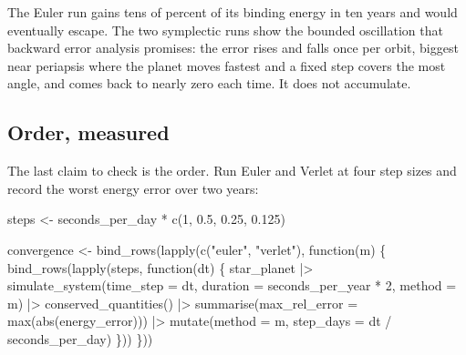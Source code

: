 \documentclass[
  10.5pt,
  letterpaper,
]{scrbook}
\newenvironment{Shaded}{\begin{snugshade}}{\end{snugshade}}
\newcommand{\AttributeTok}[1]{\textcolor[rgb]{0.00,0.00,0.00}{#1}}
\newcommand{\ControlFlowTok}[1]{\textcolor[rgb]{0.00,0.00,0.00}{#1}}
\newcommand{\DecValTok}[1]{\textcolor[rgb]{0.00,0.00,0.00}{#1}}
\newcommand{\FloatTok}[1]{\textcolor[rgb]{0.00,0.00,0.00}{#1}}
\newcommand{\FunctionTok}[1]{\textcolor[rgb]{0.00,0.00,0.00}{#1}}
\newcommand{\NormalTok}[1]{\textcolor[rgb]{0.00,0.00,0.00}{#1}}
\newcommand{\OtherTok}[1]{\textcolor[rgb]{0.00,0.00,0.00}{#1}}
\newcommand{\SpecialCharTok}[1]{\textcolor[rgb]{0.00,0.00,0.00}{#1}}
\newcommand{\StringTok}[1]{\textcolor[rgb]{0.00,0.00,0.00}{#1}}
\theoremstyle{definition}
\theoremstyle{plain}
\theoremstyle{remark}
\begin{document}
The Euler run gains tens of percent of its binding energy in ten years
and would eventually escape. The two symplectic runs show the bounded
oscillation that backward error analysis promises: the error rises and
falls once per orbit, biggest near periapsis where the planet moves
fastest and a fixed step covers the most angle, and comes back to nearly
zero each time. It does not accumulate.

\subsection{Order, measured}\label{order-measured}

The last claim to check is the order. Run Euler and Verlet at four step
sizes and record the worst energy error over two years:

\begin{Shaded}
\begin{Highlighting}[]
\NormalTok{steps }\OtherTok{\textless{}{-}}\NormalTok{ seconds\_per\_day }\SpecialCharTok{*} \FunctionTok{c}\NormalTok{(}\DecValTok{1}\NormalTok{, }\FloatTok{0.5}\NormalTok{, }\FloatTok{0.25}\NormalTok{, }\FloatTok{0.125}\NormalTok{)}

\NormalTok{convergence }\OtherTok{\textless{}{-}} \FunctionTok{bind\_rows}\NormalTok{(}\FunctionTok{lapply}\NormalTok{(}\FunctionTok{c}\NormalTok{(}\StringTok{"euler"}\NormalTok{, }\StringTok{"verlet"}\NormalTok{), }\ControlFlowTok{function}\NormalTok{(m) \{}
  \FunctionTok{bind\_rows}\NormalTok{(}\FunctionTok{lapply}\NormalTok{(steps, }\ControlFlowTok{function}\NormalTok{(dt) \{}
\NormalTok{    star\_planet }\SpecialCharTok{|\textgreater{}}
      \FunctionTok{simulate\_system}\NormalTok{(}\AttributeTok{time\_step =}\NormalTok{ dt, }\AttributeTok{duration =}\NormalTok{ seconds\_per\_year }\SpecialCharTok{*} \DecValTok{2}\NormalTok{,}
                      \AttributeTok{method =}\NormalTok{ m) }\SpecialCharTok{|\textgreater{}}
      \FunctionTok{conserved\_quantities}\NormalTok{() }\SpecialCharTok{|\textgreater{}}
      \FunctionTok{summarise}\NormalTok{(}\AttributeTok{max\_rel\_error =} \FunctionTok{max}\NormalTok{(}\FunctionTok{abs}\NormalTok{(energy\_error))) }\SpecialCharTok{|\textgreater{}}
      \FunctionTok{mutate}\NormalTok{(}\AttributeTok{method =}\NormalTok{ m, }\AttributeTok{step\_days =}\NormalTok{ dt }\SpecialCharTok{/}\NormalTok{ seconds\_per\_day)}
\NormalTok{  \}))}
\NormalTok{\}))}


\end{Highlighting}
\end{Shaded}
\end{document}
